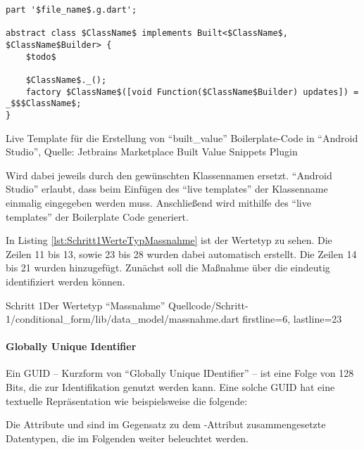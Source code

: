 \ifIncludeFigures
  \begin{listing}[h]
    \begin{verbatim}
part '$file_name$.g.dart';

abstract class $ClassName$ implements Built<$ClassName$, $ClassName$Builder> {
    $todo$
    
    $ClassName$._();
    factory $ClassName$([void Function($ClassName$Builder) updates]) = _$$$ClassName$;
}

\end{verbatim}
    \caption[\enquote{built_value} Live Template]{Live Template für die Erstellung von \enquote{built_value} Boilerplate-Code in \enquote{Android Studio}, Quelle: Jetbrains Marketplace Built Value Snippets Plugin}
    \label{lst:BuiltValueLiveTemplate}
  \end{listing}
\fi

 Wird dabei jeweils durch den gewünschten Klassennamen ersetzt.
\enquote{Android Studio} erlaubt, dass beim Einfügen des \enquote{live templates} der Klassenname einmalig eingegeben werden muss.  Anschließend wird mithilfe des \enquote{live templates} der Boilerplate Code generiert.

In Listing \ref{lst:Schritt1WerteTypMassnahme} ist der Wertetyp  zu sehen.
Die Zeilen 11 bis 13, sowie 23 bis 28 wurden dabei automatisch erstellt.
Die Zeilen 14 bis 21 wurden hinzugefügt.
Zunächst soll die Maßnahme über die  eindeutig identifiziert werden können.

\begin{alexlisting}{Schritt 1}{Der Wertetyp \enquote{Massnahme}}
  {Quellcode/Schritt-1/conditional_form/lib/data_model/massnahme.dart}
  {firstline=6, lastline=23}
  \label{lst:Schritt1WerteTypMassnahme}
\end{alexlisting}

\paragraph{Globally Unique Identifier}
Ein GUID -- Kurzform von \enquote{Globally Unique IDentifier} -- ist  eine Folge von 128 Bits, die zur Identifikation genutzt werden kann.
Eine solche GUID hat eine textuelle Repräsentation wie beispielsweise die folgende: 

Die Attribute  und  sind im Gegensatz zu dem -Attribut  zusammengesetzte Datentypen, die im Folgenden weiter beleuchtet werden.

